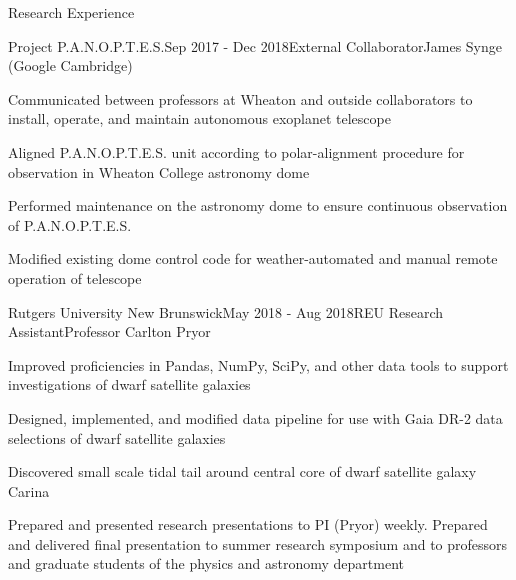 \documentclass{resume} %
\begin{document}
\begin{rSection}{Research Experience}
\newpage \begin{rSubsection}{Project P.A.N.O.P.T.E.S.}{Sep 2017 - Dec 2018}{External Collaborator}{James Synge (Google Cambridge)}
\item Communicated between professors at Wheaton and outside collaborators to install, operate, and maintain autonomous exoplanet telescope
\item Aligned P.A.N.O.P.T.E.S. unit according to polar-alignment procedure for observation in Wheaton College astronomy dome
\item Performed maintenance on the astronomy dome to ensure continuous observation of P.A.N.O.P.T.E.S.
\item Modified existing dome control code for weather-automated and manual remote operation of telescope
\end{rSubsection}

\begin{rSubsection}{Rutgers University New Brunswick}{May 2018 - Aug 2018}{REU Research Assistant}{Professor Carlton Pryor}
\item Improved proficiencies in Pandas, NumPy, SciPy, and other data tools to support investigations of dwarf satellite galaxies
\item Designed, implemented, and modified data pipeline for use with Gaia DR-2 data selections of dwarf satellite galaxies
\item Discovered small scale tidal tail around central core of dwarf satellite galaxy Carina
\item Prepared and presented research presentations to PI (Pryor) weekly. Prepared and delivered final presentation to summer research symposium and to professors and graduate students of the physics and astronomy department
\end{rSubsection}


\end{rSection}
\end{document}
